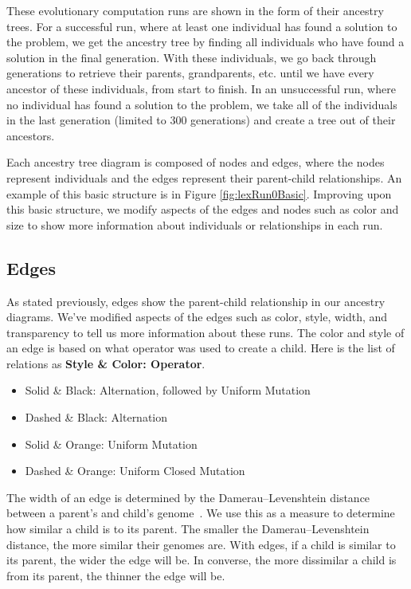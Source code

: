 \documentclass{sig-alternate}
\begin{document}
These evolutionary computation runs are shown in the form of their ancestry trees. For a successful run, where at least one individual has found a solution to the problem, we get the ancestry tree by finding all individuals who have found a solution in the final generation. With these individuals, we go back through generations to retrieve their parents, grandparents, etc. until we have every ancestor of these individuals, from start to finish. In an unsuccessful run, where no individual has found a solution to the problem, we take all of the individuals in the last generation (limited to 300 generations) and create a tree out of their ancestors.

Each ancestry tree diagram is composed of nodes and edges, where the nodes represent individuals and the edges represent their parent-child relationships. An example of this basic structure is in Figure \ref{fig:lexRun0Basic}. Improving upon this basic structure, we modify aspects of the edges and nodes such as color and size to show more information about individuals or relationships in each run.

\subsection{Edges}
\label{sec:edges}

As stated previously, edges show the parent-child relationship in our ancestry diagrams. We've modified aspects of the edges such as color, style, width, and transparency to tell us more information about these runs. The color and style of an edge is based on what operator was used to create a child. Here is the list of relations as \textbf{Style \& Color: Operator}.
\begin{itemize}
\setlength\itemsep{0em}
\item Solid \& Black: Alternation, followed by Uniform Mutation
\item Dashed \& Black: Alternation
\item Solid \& Orange: Uniform Mutation
\item Dashed \& Orange: Uniform Closed Mutation
\end{itemize}

The width of an edge is determined by the Damerau--Levenshtein distance between a parent's and child's genome~\cite{wiki:DLdist}. We use this as a measure to determine how similar a child is to its parent. The smaller the Damerau--Levenshtein distance, the more similar their genomes are. With edges, if a child is similar to its parent, the wider the edge will be. In converse, the more dissimilar a child is from its parent, the thinner the edge will be.
\end{document}
